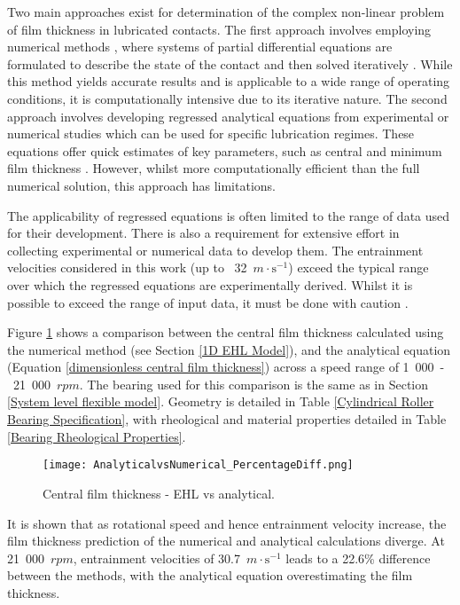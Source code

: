 Two main approaches exist for determination of the complex non-linear problem of film thickness in lubricated contacts. The first approach involves employing numerical methods \cite{Dowson1959}, where systems of partial differential equations are formulated to describe the state of the contact and then solved iteratively \cite{Gohar2018}. While this method yields accurate results and is applicable to a wide range of operating conditions, it is computationally intensive due to its iterative nature. The second approach involves developing regressed analytical equations from experimental or numerical studies which can be used for specific lubrication regimes. These equations offer quick estimates of key parameters, such as central \cite{Dowson1979} and minimum film thickness \cite{Dowson1967}. However, whilst more computationally efficient than the full numerical solution, this approach has limitations.
 
The applicability of regressed equations is often limited to the range of data used for their development. There is also a requirement for extensive effort in collecting experimental or numerical data to develop them. The entrainment velocities considered in this work (up to ~32~$m \cdot \mathrm{s}^{-1}$) exceed the typical range over which the regressed equations are experimentally derived. Whilst it is possible to exceed the range of input data, it must be done with caution \cite{Gohar1988}.

Figure \ref{EHL_NumericalvsAnalytical_25000} shows a comparison between the central film thickness calculated using the numerical method (see Section \ref{1D EHL Model}), and the analytical equation (Equation \ref{dimensionless central film thickness}) across a speed range of 1~000~-~21~000~$rpm$. The bearing used for this comparison is the same as in Section \ref{System level flexible model}. Geometry is detailed in Table \ref{Cylindrical Roller Bearing Specification}, with rheological and material properties detailed in Table \ref{Bearing Rheological Properties}.

\begin{figure}
	\centering
	\texttt{[image: AnalyticalvsNumerical\_PercentageDiff.png]}
	\caption{Central film thickness - EHL vs analytical.}
	\label{EHL_NumericalvsAnalytical_25000}
\end{figure} 

It is shown that as rotational speed and hence entrainment velocity increase, the film thickness prediction of the numerical and analytical calculations diverge. At 21~000~$rpm$, entrainment velocities of 30.7~$m \cdot \mathrm{s}^{-1}$ leads to a 22.6\% difference between the methods, with the analytical equation overestimating the film thickness.

